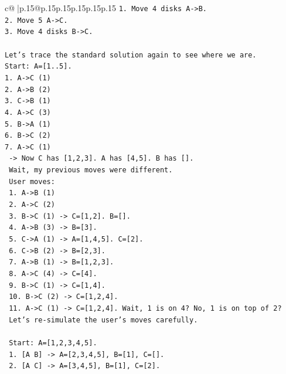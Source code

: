 \documentclass{article}
\begin{document}
{\begin{supertabular}{c@{$\;$}|p{.15\linewidth}@{}p{.15\linewidth}p{.15\linewidth}p{.15\linewidth}p{.15\linewidth}p{.15\linewidth}}
{{{\texttt{1. Move 4 disks A{-}>B.} \\
\texttt{2. Move 5 A{-}>C.} \\
\texttt{3. Move 4 disks B{-}>C.} \\
\\ 
\texttt{Let's trace the standard solution again to see where we are.} \\
\texttt{Start: A={[}1..5{]}.} \\
\texttt{1. A{-}>C (1)} \\
\texttt{2. A{-}>B (2)} \\
\texttt{3. C{-}>B (1)} \\
\texttt{4. A{-}>C (3)} \\
\texttt{5. B{-}>A (1)} \\
\texttt{6. B{-}>C (2)} \\
\texttt{7. A{-}>C (1)} \\
\texttt{   {-}> Now C has {[}1,2,3{]}. A has {[}4,5{]}. B has {[}{]}.} \\
\texttt{   Wait, my previous moves were different.} \\
\texttt{   User moves:} \\
\texttt{   1. A{-}>B (1)} \\
\texttt{   2. A{-}>C (2)} \\
\texttt{   3. B{-}>C (1) {-}> C={[}1,2{]}. B={[}{]}.} \\
\texttt{   4. A{-}>B (3) {-}> B={[}3{]}.} \\
\texttt{   5. C{-}>A (1) {-}> A={[}1,4,5{]}. C={[}2{]}.} \\
\texttt{   6. C{-}>B (2) {-}> B={[}2,3{]}.} \\
\texttt{   7. A{-}>B (1) {-}> B={[}1,2,3{]}.} \\
\texttt{   8. A{-}>C (4) {-}> C={[}4{]}.} \\
\texttt{   9. B{-}>C (1) {-}> C={[}1,4{]}.} \\
\texttt{   10. B{-}>C (2) {-}> C={[}1,2,4{]}.} \\
\texttt{   11. A{-}>C (1) {-}> C={[}1,2,4{]}. Wait, 1 is on 4? No, 1 is on top of 2?} \\
\texttt{   Let's re{-}simulate the user's moves carefully.} \\
\\ 
\texttt{   Start: A={[}1,2,3,4,5{]}.} \\
\texttt{   1. {[}A B{]} {-}> A={[}2,3,4,5{]}, B={[}1{]}, C={[}{]}.} \\
\texttt{   2. {[}A C{]} {-}> A={[}3,4,5{]}, B={[}1{]}, C={[}2{]}.} \\
}}}
\end{supertabular}}
\end{document}
